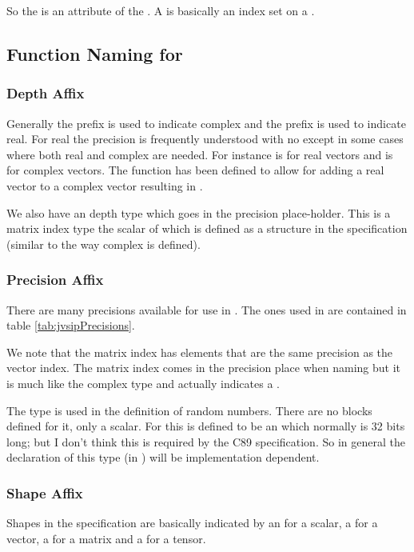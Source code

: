 So the  is an attribute of the . A  is basically an index set on a .
%
\subsection*{Function Naming for \cvl}
\subsubsection*{Depth Affix}
Generally the prefix  is used to indicate complex and the prefix  is used to indicate real. For real the precision is frequently understood with no  except in some cases where both real and complex are needed. For instance  is for real vectors and  is for complex vectors. The function  has been defined to allow for adding a real vector to a complex vector resulting in .

We also have an  depth type which goes in the precision place-holder. This is a matrix index type the scalar of which is defined as a structure in the \cvl{} specification (similar to the way complex is defined).
%
\subsubsection*{Precision Affix}
There are many precisions available for use in . The ones used in \jv{} are contained in table \ref{tab:jvsipPrecisions}.  

We note that the matrix index has elements that are the same precision as the vector index. The matrix index comes in the precision place when naming but it is much like the complex type and actually indicates a .

The type  is used in the definition of  random numbers. There are no blocks defined for it, only a scalar.  For \jv{} this is defined to be an  which normally is 32 bits long; but I don't think this is required by the C89 specification. So in general the declaration of this type (in ) will be implementation dependent.

%
\subsubsection*{Shape Affix}
Shapes in the \cvl{} specification are basically indicated by an  for a scalar, a  for a vector, a  for a matrix and a  for a tensor.

